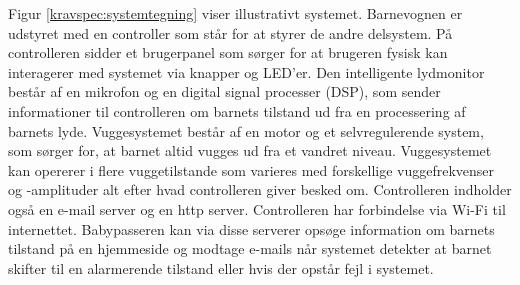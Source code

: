 Figur \ref{kravspec:systemtegning} viser illustrativt systemet. Barnevognen er udstyret med en controller som står for at styrer de andre delsystem. På controlleren sidder et brugerpanel som sørger for at brugeren fysisk kan interagerer med systemet via knapper og LED'er.
Den intelligente lydmonitor består af en mikrofon og en digital signal processer (DSP), som sender informationer til controlleren om barnets tilstand ud fra en processering af barnets lyde. Vuggesystemet består af en motor og et selvregulerende system, som sørger for, at barnet altid vugges ud fra et vandret niveau. Vuggesystemet kan opererer i flere vuggetilstande som varieres med forskellige vuggefrekvenser og -amplituder alt efter hvad controlleren giver besked om.  Controlleren indholder også en e-mail server og en http server. Controlleren har forbindelse via Wi-Fi til internettet. Babypasseren kan via disse serverer opsøge information om barnets tilstand på en hjemmeside og modtage e-mails når systemet detekter at barnet skifter til en alarmerende tilstand eller hvis der opstår fejl i systemet.